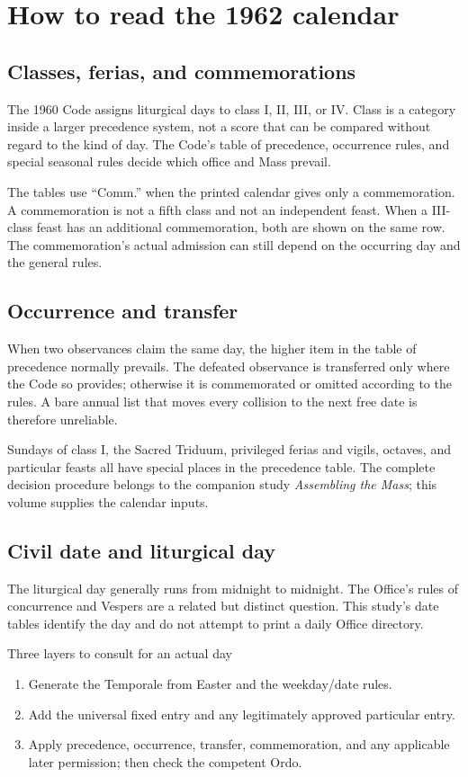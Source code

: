 \section{How to read the 1962 calendar}

\subsection{Classes, ferias, and commemorations}

The 1960 Code assigns liturgical days to class I, II, III, or IV. Class is a category inside a larger precedence system, not a score that can be compared without regard to the kind of day. The Code's table of precedence, occurrence rules, and special seasonal rules decide which office and Mass prevail.

The tables use ``Comm.'' when the printed calendar gives only a commemoration. A commemoration is not a fifth class and not an independent feast. When a III-class feast has an additional commemoration, both are shown on the same row. The commemoration's actual admission can still depend on the occurring day and the general rules.

\subsection{Occurrence and transfer}

When two observances claim the same day, the higher item in the table of precedence normally prevails. The defeated observance is transferred only where the Code so provides; otherwise it is commemorated or omitted according to the rules. A bare annual list that moves every collision to the next free date is therefore unreliable.

Sundays of class I, the Sacred Triduum, privileged ferias and vigils, octaves, and particular feasts all have special places in the precedence table. The complete decision procedure belongs to the companion study \emph{Assembling the Mass}; this volume supplies the calendar inputs.

\subsection{Civil date and liturgical day}

The liturgical day generally runs from midnight to midnight. The Office's rules of concurrence and Vespers are a related but distinct question. This study's date tables identify the day and do not attempt to print a daily Office directory.

\begin{studybox}{Three layers to consult for an actual day}
\begin{enumerate}[leftmargin=1.6em,itemsep=0.25em]
\item Generate the Temporale from Easter and the weekday/date rules.
\item Add the universal fixed entry and any legitimately approved particular entry.
\item Apply precedence, occurrence, transfer, commemoration, and any applicable later permission; then check the competent Ordo.
\end{enumerate}
\end{studybox}
